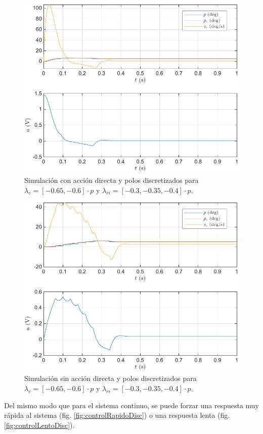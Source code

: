 \documentclass{article}
\begin{document}
\begin{figure}[H]
    \centering
    \includegraphics[width=0.75\linewidth]{img/accionDirectaDisc.pdf}
    \caption{Simulación con acción directa y polos discretizados para $\lambda_e = \left[ -0.65, -0.6 \right]\cdot p$ y $\lambda_{ri} = \left[ -0.3, -0.35, -0.4 \right]\cdot p$.}
    \label{fig:accionDirectaDisc}
\end{figure}

\begin{figure}[H]
    \centering
    \includegraphics[width=0.75\linewidth]{img/controlJustoDisc.pdf}
    \caption{Simulación sin acción directa y polos discretizados para $\lambda_e = \left[ -0.65, -0.6 \right]\cdot p$ y $\lambda_{ri} = \left[ -0.3, -0.35, -0.4 \right]\cdot p$.}
    \label{fig:controlJustoDisc}
\end{figure}

Del mismo modo que para el sistema continuo, se puede forzar una respuesta muy rápida al sistema (fig. \ref{fig:controlRapidoDisc}) o una respuesta lenta (fig. \ref{fig:controlLentoDisc}).
\end{document}
